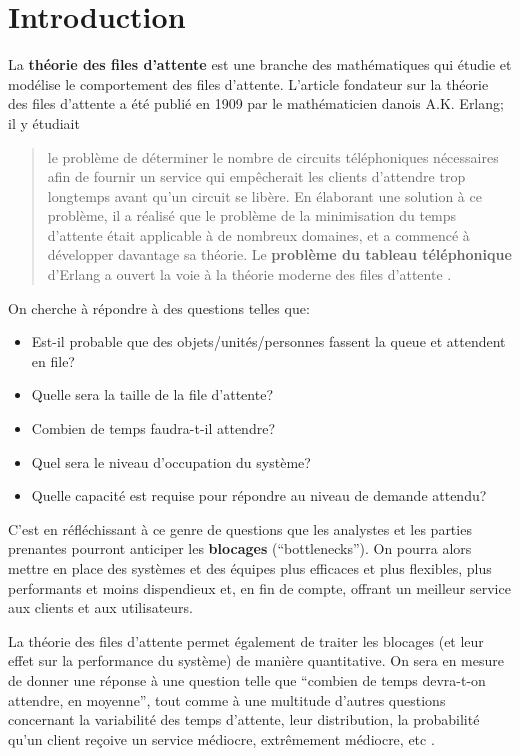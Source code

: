 \section{Introduction} La \textbf{théorie des files d'attente} est une branche des mathématiques qui étudie et modélise le comportement des files d'attente. L'article fondateur sur la théorie des files d'attente \cite{QS_Erlang} a été publié en 1909 par le mathématicien danois A.K. Erlang; il y étudiait \begin{quote} le problème de déterminer le nombre de circuits téléphoniques nécessaires afin de fournir un service qui empêcherait les clients d'attendre trop longtemps avant qu'un circuit se libère. En élaborant une solution à ce problème, il a  réalisé que le problème de la minimisation du temps d'attente était applicable à de nombreux domaines, et a commencé à développer davantage sa théorie. Le \textbf{problème du tableau téléphonique} d'Erlang a ouvert la voie à la théorie moderne des files d'attente \cite{QS_Berry}.\end{quote}
On cherche à répondre à des questions telles que:
\begin{itemize}[noitemsep]
\item Est-il probable que des objets/unités/personnes fassent la queue et attendent en file?
\item Quelle sera la taille de la file d'attente?
\item Combien de temps faudra-t-il attendre?
\item Quel sera le niveau d'occupation du système?
\item Quelle capacité est requise pour répondre au niveau de demande attendu?
\end{itemize}
C'est en réfléchissant à ce genre de questions que les analystes et les parties prenantes pourront anticiper les \textbf{blo\-ca\-ges} (``bottlenecks''). On pourra alors mettre en place des systèmes et des équipes plus efficaces et plus flexibles, plus performants et moins dispendieux et, en fin de compte, offrant un meilleur service aux clients et aux utilisateurs. \par La théorie des files d'attente permet également de traiter les blocages (et leur effet sur la performance du système) de manière quantitative. On sera en mesure de donner une réponse à une question telle que ``combien de temps devra-t-on attendre, en moyenne'', tout comme à une multitude d'autres questions concernant la variabilité des temps d'attente, leur distribution, la probabilité qu'un client reçoive un service médiocre, extrêmement médiocre, etc \cite{QS_K1}.
